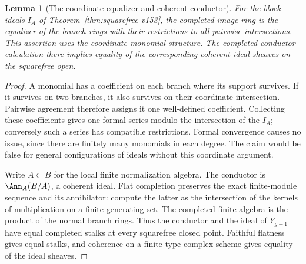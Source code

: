 \documentclass[11pt,reqno]{amsart}
\numberwithin{equation}{section}
\newtheorem{lemma}[theorem]{Lemma}
\theoremstyle{definition}\newtheorem{definition}[theorem]{Definition}
\theoremstyle{remark}\newtheorem{remark}[theorem]{Remark}
\begin{document}
\begin{lemma}[The coordinate equalizer and coherent conductor]
\label{lem:equalizer-v154}
For the block ideals $I_A$ of Theorem~\ref{thm:squarefree-v153},
the completed image ring is the equalizer of the branch rings with
their restrictions to all pairwise intersections. This assertion
uses the coordinate monomial structure. The completed conductor
calculation there implies equality of the corresponding coherent
ideal sheaves on the squarefree open.
\end{lemma}
\begin{proof}
A monomial has a coefficient on each branch where its support
survives. If it survives on two branches, it also survives on their
coordinate intersection. Pairwise agreement therefore assigns it
one well-defined coefficient. Collecting these coefficients gives
one formal series modulo the intersection of the $I_A$; conversely
such a series has compatible restrictions. Formal convergence causes
no issue, since there are finitely many monomials in each degree.
The claim would be false for general configurations of ideals without
this coordinate argument.

Write $A\subset B$ for the local finite normalization algebra.
The conductor is $\Ann_A(B/A)$, a coherent ideal. Flat completion
preserves the exact finite-module sequence and its annihilator:
compute the latter as the intersection of the kernels of multiplication
on a finite generating set. The completed finite algebra is the
product of the normal branch rings. Thus the conductor and the ideal
of $Y_{g+1}$ have equal completed stalks at every squarefree closed
point. Faithful flatness gives equal stalks, and coherence on a
finite-type complex scheme gives equality of the ideal sheaves.
\end{proof}
\end{document}
